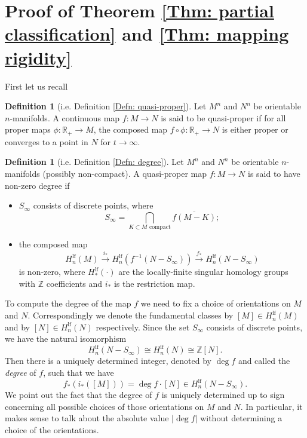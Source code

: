 \documentclass[11pt,letterpaper]{amsart}
\numberwithin{equation}{section}
\theoremstyle{definition}
\newtheorem{definition}[theorem]{Definition}
\begin{document}
\section{Proof of Theorem \ref{Thm: partial classification} and \ref{Thm: mapping rigidity}}\label{Sec: compact-to-complete}
First let us recall
{
\begin{definition}[i.e. Definition \ref{Defn: quasi-proper}]
Let $M^{n}$ and $N^{n}$ be orientable $n$-manifolds. A continuous map $f:M \to N$ is said to be quasi-proper if for all proper maps $\phi:\mathbb{R}_{+}\to M$, the composed map $f\circ\phi:\mathbb{R}_{+}\to N$ is either proper or converges to a point in $N$ for $t\to\infty$.
\end{definition}
}
\begin{definition}[i.e. Definition \ref{Defn: degree}]
Let $M^{n}$ and $N^{n}$ be orientable $n$-manifolds (possibly non-compact). A quasi-proper map $f:M\to N$ is said to have non-zero degree if
	\begin{itemize}\setlength{\itemsep}{1mm}
	\item $S_\infty$ consists of discrete points, where
 $$S_\infty=\bigcap_{K\subset M \text{ compact}} \overline{f(M-K)};$$
	\item the composed map
	$$H_n^{\mathrm{lf}}(M)\xrightarrow{i_*} H_n^{\mathrm{lf}}(f^{-1}(N-S_\infty))\xrightarrow{f_*} H_n^{\mathrm{lf}}(N-S_\infty)$$
	is non-zero, where $H_{\ast}^{\mathrm{lf}}(\cdot)$ are the locally-finite singular homology groups {with $\mathbb{Z}$ coefficients} and $i_{*}$ is the restriction map.
\end{itemize}
\end{definition}

To compute the degree of the map $f$ we need to fix a choice of orientations on $M$ and $N$. Correspondingly we denote the fundamental classes by $[M]\in H_n^{\mathrm{lf}}(M)$ and by $[N]\in H_n^{\mathrm{lf}}(N)$ respectively. Since the set $S_\infty$ consists of discrete points, we have the natural isomorphism
$$
H_n^{\mathrm{lf}}(N-S_\infty)\cong H_n^{\mathrm{lf}}(N)\cong \mathbb Z[N].
$$
Then there is a uniquely determined integer, denoted by $\deg f$ and called the \emph{degree} of $f$, such that we have
$$f_*(i_*([M]))=\deg f\cdot [N]\in H_n^{\mathrm{lf}}( N-S_\infty).$$
We point out the fact that the degree of $f$ is uniquely determined up to sign concerning all possible choices of those orientations on $M$ and $N$. In particular, it makes sense to talk about the absolute value $|\deg f|$ without determining a choice of the orientations.
\end{document}
